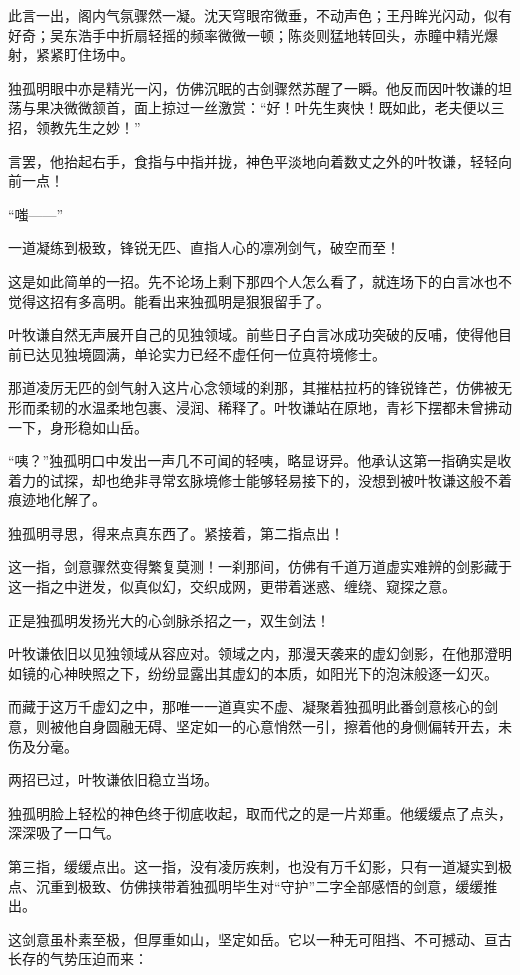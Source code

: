 此言一出，阁内气氛骤然一凝。沈天穹眼帘微垂，不动声色；王丹眸光闪动，似有好奇；吴东浩手中折扇轻摇的频率微微一顿；陈炎则猛地转回头，赤瞳中精光爆射，紧紧盯住场中。

独孤明眼中亦是精光一闪，仿佛沉眠的古剑骤然苏醒了一瞬。他反而因叶牧谦的坦荡与果决微微颔首，面上掠过一丝激赏：“好！叶先生爽快！既如此，老夫便以三招，领教先生之妙！”

言罢，他抬起右手，食指与中指并拢，神色平淡地向着数丈之外的叶牧谦，轻轻向前一点！

“嗤——”

一道凝练到极致，锋锐无匹、直指人心的凛冽剑气，破空而至！

这是如此简单的一招。先不论场上剩下那四个人怎么看了，就连场下的白言冰也不觉得这招有多高明。能看出来独孤明是狠狠留手了。

叶牧谦自然无声展开自己的见独领域。前些日子白言冰成功突破的反哺，使得他目前已达见独境圆满，单论实力已经不虚任何一位真符境修士。

那道凌厉无匹的剑气射入这片心念领域的刹那，其摧枯拉朽的锋锐锋芒，仿佛被无形而柔韧的水温柔地包裹、浸润、稀释了。叶牧谦站在原地，青衫下摆都未曾拂动一下，身形稳如山岳。

“咦？”独孤明口中发出一声几不可闻的轻咦，略显讶异。他承认这第一指确实是收着力的试探，却也绝非寻常玄脉境修士能够轻易接下的，没想到被叶牧谦这般不着痕迹地化解了。

独孤明寻思，得来点真东西了。紧接着，第二指点出！

这一指，剑意骤然变得繁复莫测！一刹那间，仿佛有千道万道虚实难辨的剑影藏于这一指之中迸发，似真似幻，交织成网，更带着迷惑、缠绕、窥探之意。

正是独孤明发扬光大的心剑脉杀招之一，双生剑法！

叶牧谦依旧以见独领域从容应对。领域之内，那漫天袭来的虚幻剑影，在他那澄明如镜的心神映照之下，纷纷显露出其虚幻的本质，如阳光下的泡沫般逐一幻灭。

而藏于这万千虚幻之中，那唯一一道真实不虚、凝聚着独孤明此番剑意核心的剑意，则被他自身圆融无碍、坚定如一的心意悄然一引，擦着他的身侧偏转开去，未伤及分毫。

两招已过，叶牧谦依旧稳立当场。

独孤明脸上轻松的神色终于彻底收起，取而代之的是一片郑重。他缓缓点了点头，深深吸了一口气。

第三指，缓缓点出。这一指，没有凌厉疾刺，也没有万千幻影，只有一道凝实到极点、沉重到极致、仿佛挟带着独孤明毕生对“守护”二字全部感悟的剑意，缓缓推出。

这剑意虽朴素至极，但厚重如山，坚定如岳。它以一种无可阻挡、不可撼动、亘古长存的气势压迫而来：

